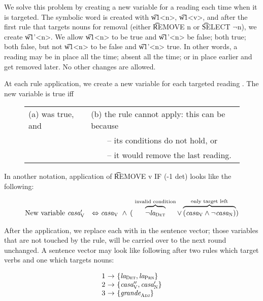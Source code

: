 We solve this problem by creating a new variable for a reading each time when it is targeted. The symbolic word is created with \t{w1<n>}, \t{w1<v>}, and after the first rule that targets nouns for removal (either \t{REMOVE n} or \t{SELECT $\neg$n}), we create \t{w1'<n>}. We allow \t{w1<n>} to be true and \t{w1'<n>} be false; both true; both false, but not \t{w1<n>} to be false and \t{w1'<n>} true. In other words, a reading may be in place all the time; absent all the time; or in place earlier and get removed later. No other changes are allowed.

At each rule application, we create a new variable \newVar{} for each targeted reading \oldVar{}.
The new variable \newVar{} is true iff 

\begin{figure}[h]
\begin{tabular}{l l}
(a) \oldVar{} was true, and 
                             & (b) the rule cannot apply: this can be because \\
                                     & ~~~~-- its conditions do not hold, or \\
                                     & ~~~~-- it would remove the last reading.
\end{tabular}
\end{figure}

\noindent In another notation, application of \t{REMOVE v IF (-1 det)} looks like the following:

$$\begin{array}{r l}
\text{New variable } \casa{}'_\v 
      & \Leftrightarrow \casaV\ 
        \wedge\: ( \; \ob{\neg\laDet}^{\invConds} 
        \vee  \ob{(\casaV \wedge \neg \casaN) }^{\onlyTrgLeft} ) \\
\end{array}$$


\noindent After the application, we replace each \oldVar with \newVar in the sentence vector; those variables that are not touched by the rule, will be carried over to the next round unchanged. A sentence vector may look like following after two rules which target verbs and one which targets nouns:


$$\begin{array}{l @{~\rightarrow~} l}
1 & \{\laDet, \laPrn \} \\
2 & \{\casa{}''_\v, \casa{}'_\n \} \\
3 & \{ \grandeAdj \} \\
\end{array}$$

